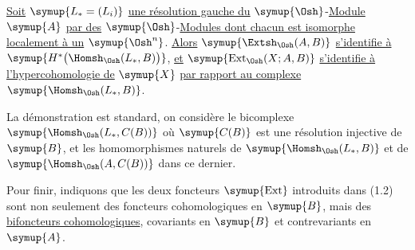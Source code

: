 \uline{Soit} $\symup{L_{*}=(L_i)}$ \uline{une résolution gauche du}
$\symup{\Osh}$-\uline{Module} $\symup{A}$ \uline{par des} $\symup{\Osh}$-\uline{Modules dont chacun est isomorphe localement à
un} $\symup{\Osh^{n}}$. \uline{Alors} $\symup{\Extsh_{\Osh}(A,B)}$ \uline{s'identifie à}
$\symup{H^{*}\bigl(\Homsh_{\Osh}(L_{*},B)\bigr)}$, \uline{et}
$\symup{\operatorname{Ext}_{\Osh}(X;A,B)}$ \uline{s'identifie à l'hypercohomologie de} $\symup{X}$
\uline{par rapport au complexe} $\symup{\Homsh_{\Osh}(L_{*},B)}$.

La démonstration est standard, on considère le bicomplexe
$\symup{\Homsh_{\Osh}(L_{*},C(B))}$ où $\symup{C(B)}$ est une résolution injective de $\symup{B}$, et les
homomorphismes naturels de $\symup{\Homsh_{\Osh}(L_{*},B)}$ et de
$\symup{\Homsh_{\Osh}(A,C(B))}$ dans ce dernier.

Pour finir, indiquons que les deux foncteurs $\symup{\operatorname{Ext}}$ introduits
dans (1.2) sont non seulement des foncteurs cohomologiques en $\symup{B}$, mais des
\uline{bifoncteurs cohomologiques}, covariants en $\symup{B}$ et contrevariants en $\symup{A}$.


